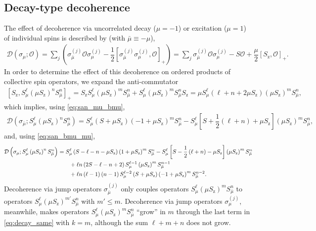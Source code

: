 \documentclass[aps,notitlepage,nofootinbib,11pt]{revtex4-1}
\newcommand{\f}[2]{\dfrac{#1}{#2}} %
\newcommand{\p}[1]{\left(#1\right)} %
\renewcommand{\sp}[1]{\left[#1\right]} %
\newcommand{\D}{\mathcal{D}}
\renewcommand{\O}{\mathcal{O}}
\newcommand{\z}{\text{z}}
\newcommand{\bmu}{{\bar\mu}}
\newcommand{\1}{\mathds{1}}
\begin{document}
\subsection{Decay-type decoherence}
\label{sec:decay_single}

The effect of decoherence via uncorrelated decay ($\mu=-1$) or
excitation ($\mu=1$) of individual spins is described by (with
$\bmu\equiv-\mu$),
\begin{align}
  \D\p{\sigma_\mu; \O}
  = \sum_j\p{\sigma_\bmu^{(j)} \O \sigma_\mu^{(j)}
    - \f12\sp{\sigma_\bmu^{(j)} \sigma_\mu^{(j)},\O}_+}
  = \sum_j \sigma_\bmu^{(j)} \O \sigma_\mu^{(j)}
    - S \O + \f{\mu}{2} \sp{S_\z, \O}_+.
\end{align}
In order to determine the effect of this decoherence on ordered
products of collective spin operators, we expand the anti-commutator
\begin{align}
  \sp{S_\z, S_\mu^\ell \p{\mu S_\z}^n S_\bmu^n}_+
  = S_\z S_\mu^\ell \p{\mu S_\z}^m S_\bmu^n
  + S_\mu^\ell \p{\mu S_\z}^m S_\bmu^n S_\z
  = \mu S_\mu^\ell\p{\ell+n+2\mu S_\z} \p{\mu S_\z}^m S_\bmu^n,
\end{align}
which implies, using \eqref{eq:san_mu_bmu},
\begin{align}
  \D\p{\sigma_\bmu; S_\mu^\ell \p{\mu S_\z}^n S_\bmu^n}
  = S_\mu^\ell \p{S+\mu S_\z}\p{-1+\mu S_\z}^m S_\bmu^n
  - S_\mu^\ell\sp{S + \f12\p{\ell+n} + \mu S_\z}
  \p{\mu S_\z}^m S_\bmu^n,
  \label{eq:decay_diff}
\end{align}
and, using \eqref{eq:san_bmu_mu},
\begin{align}
  \D\p{\sigma_\mu; S_\mu^\ell \p{\mu S_\z}^n S_\bmu^n}
  &= S_\mu^\ell \p{S - \ell - n - \mu S_\z} \p{1+\mu S_\z}^m S_\bmu^n
  - S_\mu^\ell\sp{S - \f12\p{\ell+n} - \mu S_\z}
  \p{\mu S_\z}^m S_\bmu^n \notag \\
  &\qquad + \ell n \p{2S - \ell - n + 2}
  S_\mu^{\ell-1} \p{\mu S_\z}^m S_\bmu^{n-1} \notag \\
  &\qquad + \ell n \p{\ell-1} \p{n-1} S_\mu^{\ell-2} \p{S + \mu S_\z}
  \p{-1+\mu S_\z}^m S_\bmu^{n-2}.
  \label{eq:decay_same}
\end{align}
Decoherence via jump operators $\sigma_\bmu^{(j)}$ only couples
operators $S_\mu^\ell \p{\mu S_\z}^m S_\bmu^n$ to operators
$S_\mu^\ell \p{\mu S_\z}^{m'} S_\bmu^n$ with $m'\le m$.  Decoherence
via jump operators $\sigma_\mu^{(j)}$, meanwhile, makes operators
$S_\mu^\ell \p{\mu S_\z}^m S_\bmu^n$ ``grow'' in $m$ through the last
term in \eqref{eq:decay_same} with $k=m$, although the sum $\ell+m+n$
does not grow.
\end{document}
